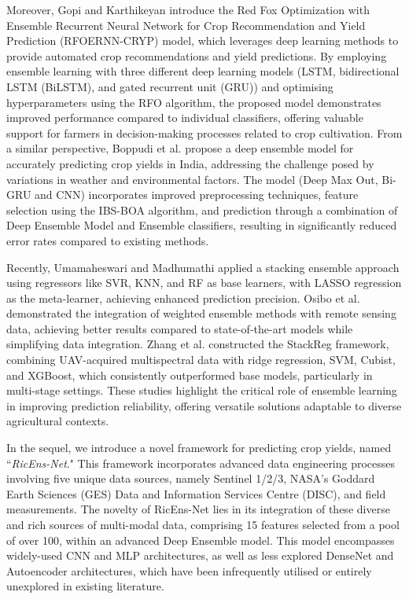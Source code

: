 Moreover, Gopi and Karthikeyan \cite{gopi2024red} introduce the Red Fox Optimization with Ensemble Recurrent Neural Network for Crop Recommendation and Yield Prediction (RFOERNN-CRYP) model, which leverages deep learning methods to provide automated crop recommendations and yield predictions. By employing ensemble learning with three different deep learning models (LSTM, bidirectional LSTM (BiLSTM), and gated recurrent unit (GRU)) and optimising hyperparameters using the RFO algorithm, the proposed model demonstrates improved performance compared to individual classifiers, offering valuable support for farmers in decision-making processes related to crop cultivation. From a similar perspective, Boppudi et al. \cite{boppudi2024deep} propose a deep ensemble model for accurately predicting crop yields in India, addressing the challenge posed by variations in weather and environmental factors. The model (Deep Max Out, Bi-GRU and CNN) incorporates improved preprocessing techniques, feature selection using the IBS-BOA algorithm, and prediction through a combination of Deep Ensemble Model and Ensemble classifiers, resulting in significantly reduced error rates compared to existing methods.

Recently, Umamaheswari and Madhumathi \cite{umamaheswari2024predicting} applied a stacking ensemble approach using regressors like SVR, KNN, and RF as base learners, with LASSO regression as the meta-learner, achieving enhanced prediction precision. Osibo et al. \cite{osibo2024integrating} demonstrated the integration of weighted ensemble methods with remote sensing data, achieving better results compared to state-of-the-art models while simplifying data integration. Zhang et al. \cite{zhang2024ensemble} constructed the StackReg framework, combining UAV-acquired multispectral data with ridge regression, SVM, Cubist, and XGBoost, which consistently outperformed base models, particularly in multi-stage settings. These studies highlight the critical role of ensemble learning in improving prediction reliability, offering versatile solutions adaptable to diverse agricultural contexts.

In the sequel, we introduce a novel framework for predicting crop yields, named ``\textit{RicEns-Net}." This framework incorporates advanced data engineering processes involving five unique data sources, namely Sentinel 1/2/3, NASA's Goddard Earth Sciences (GES) Data and Information Services Centre (DISC), and field measurements. The novelty of RicEns-Net lies in its integration of these diverse and rich sources of multi-modal data, comprising 15 features selected from a pool of over 100, within an advanced Deep Ensemble model. This model encompasses widely-used CNN and MLP architectures, as well as less explored DenseNet and Autoencoder architectures, which have been infrequently utilised or entirely unexplored in existing literature.

